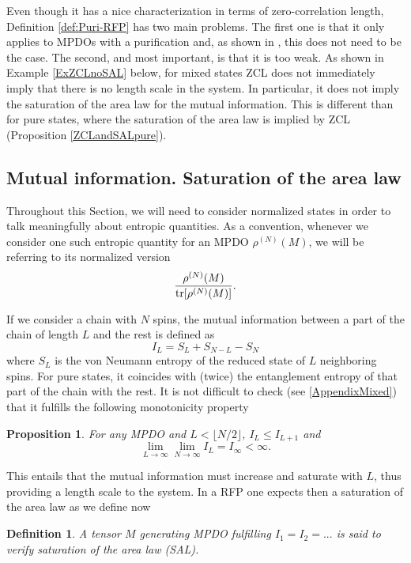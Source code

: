 \documentclass{elsarticle}
\newcommand{\be}{\begin{equation}}
\newcommand{\ee}{\end{equation}}
\newtheorem{prop}[thm]{Proposition}
\newtheorem{defn}[thm]{Definition}
\begin{document}
Even though it has a nice characterization in terms of zero-correlation length, Definition \ref{def:Puri-RFP} has two main problems. The first one is that it only applies to MPDOs with a purification and, as shown in \cite{Gemma}, this does not need to be the case. The second, and most important, is that it is too weak. As shown in Example \ref{ExZCLnoSAL} below, for mixed states ZCL does not immediately imply that there is no length scale in the system. In particular, it does not imply the saturation of the area law for the mutual information. This is different than for pure states, where the saturation of the area law is implied by ZCL (Proposition \ref{ZCLandSALpure}).

\subsection{Mutual information. Saturation of the area law}
\label{MixedMutual}

Throughout this Section, we will need to consider normalized states in order to talk meaningfully about entropic quantities. As a convention, whenever we consider one such entropic quantity for an MPDO $\rho^{(N)}(M)$, we will be referring to its normalized version
$$\frac{\rho^{(N)}(M)}{{\rm tr}[\rho^{(N)}(M)]}.$$

If we consider a chain with $N$ spins, the mutual information between a part of the chain of length $L$ and the rest is defined as
\be
    I_L = S_L + S_{N-L}- S_N
\ee
where $S_L$ is the von Neumann entropy of the reduced state of $L$ neighboring spins. For pure states, it coincides with (twice) the entanglement entropy of that part of the chain with the rest. It is not difficult to check (see \ref{AppendixMixed}) that it fulfills the following monotonicity property

\begin{prop}
    \label{PropILILp1}
    For any MPDO and $L<\lfloor N/2\rfloor$, $I_{L}\le I_{L+1}$ and
    \be
        \lim_{L\to\infty} \lim_{N\to\infty} I_L =I_\infty <\infty.
    \ee
\end{prop}

This entails that the mutual information must increase and saturate with $L$, thus providing a length scale to the system. In a RFP one expects then a saturation of the area law as we define now

\begin{defn}\label{def:area-law}
    A tensor $M$ generating MPDO fulfilling $I_1=I_2=...$ is said to verify {\em saturation of the area law} (SAL).
\end{defn}
\end{document}
